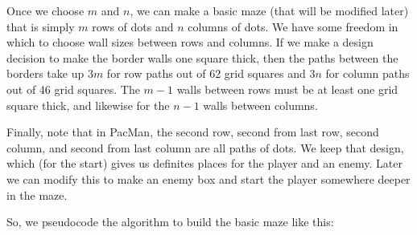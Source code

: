 \documentclass[12pt]{amsbook}
\theoremstyle{definition}
\theoremstyle{remark}
\numberwithin{figure}{chapter}
\numberwithin{table}{chapter}
\numberwithin{section}{chapter}
\numberwithin{equation}{section}
\begin{document}
Once we choose $m$ and $n$, we can make a basic maze (that will be modified later) that is simply $m$ rows of dots and $n$ columns of dots.  We have some freedom in which to choose wall sizes between rows and columns.  If we make a design decision to make the border walls one square thick, then the paths between the borders take up $3m$ for row paths out of 62 grid squares and $3n$ for column paths out of 46 grid squares.  The $m-1$ walls between rows must be at least one grid square thick, and likewise for the $n-1$ walls between columns.  

Finally, note that in PacMan, the second row, second from last row, second column, and second from last column are all paths of dots.  We keep that design, which (for the start) gives us definites places for the player and an enemy.  Later we can modify this to make an enemy box and start the player somewhere deeper in the maze.

So, we pseudocode the algorithm to build the basic maze like this:

\begin{algorithmic}[1]





\ENDFOR


\ENDFOR


\ENDFOR


\ENDFOR
\end{algorithmic}
\end{document}
